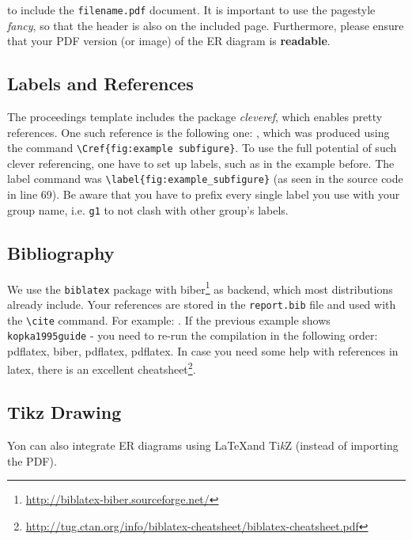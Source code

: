 \verb|| \smallskip

to include the \verb|filename.pdf| document.
It is important to use the pagestyle \emph{fancy}, so that the header is also on the included page. Furthermore, please ensure that your PDF version (or image) of the ER diagram is \textbf{readable}.


\subsection*{Labels and References}
The proceedings template includes the package \textit{cleveref}, which enables pretty references. One such reference is the following one: , which was produced using the command \verb|\Cref{fig:example subfigure}|.
To use the full potential of such clever referencing, one have to set up labels, such as in the example before. The label command was \verb|\label{fig:example_subfigure}| (as seen in the source code in line 69).
Be aware that you have to prefix every single label you use with your group name, i.e. \verb|g1| to not clash with other group's labels.

\subsection*{Bibliography}
We use the \verb|biblatex| package with biber\footnote{\url{http://biblatex-biber.sourceforge.net/}} as backend, which most distributions already include.
Your references are stored in the \texttt{report.bib} file and used with the \texttt{\textbackslash cite} command. 
For example: \cite{kopka1995guide}. 
If the previous example shows \verb|kopka1995guide| - you need to re-run the compilation in the following order: pdflatex, biber, pdflatex, pdflatex.
In case you need some help with references in latex, there is an excellent cheatsheet\footnote{\url{http://tug.ctan.org/info/biblatex-cheatsheet/biblatex-cheatsheet.pdf}}.

\newpage
\subsection*{Tikz Drawing}

Yon can also integrate ER diagrams using \LaTeX and Ti\textit{k}Z (instead of importing the PDF).

